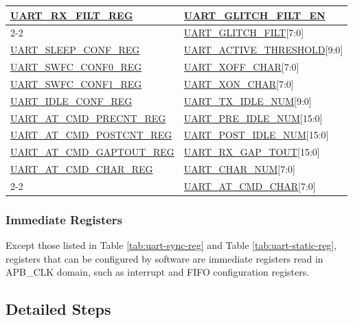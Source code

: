 \documentclass[main\_\_EN.tex]{subfiles}
\begin{document}
\begin{longtable}[c]{|p{6cm}|p{6cm}|}
\hyperref[regdesc:UARTRXFILTREG]{UART\_RX\_FILT\_REG} & \hyperref[fielddesc:UARTGLITCHFILTEN]{UART\_GLITCH\_FILT\_EN} \\\cline{2-2}
 & \hyperref[fielddesc:UARTGLITCHFILT]{UART\_GLITCH\_FILT}[7:0] \\\hline
\hyperref[regdesc:UARTSLEEPCONFREG]{UART\_SLEEP\_CONF\_REG} & \hyperref[fielddesc:UARTACTIVETHRESHOLD]{UART\_ACTIVE\_THRESHOLD}[9:0] \\\hline
\hyperref[regdesc:UARTSWFCCONF0REG]{UART\_SWFC\_CONF0\_REG} & \hyperref[fielddesc:UARTXOFFCHAR]{UART\_XOFF\_CHAR}[7:0] \\\hline
\hyperref[regdesc:UARTSWFCCONF1REG]{UART\_SWFC\_CONF1\_REG} & \hyperref[fielddesc:UARTXONCHAR]{UART\_XON\_CHAR}[7:0] \\\hline
\hyperref[regdesc:UARTIDLECONFREG]{UART\_IDLE\_CONF\_REG} & \hyperref[fielddesc:UARTTXIDLENUM]{UART\_TX\_IDLE\_NUM}[9:0] \\\hline
\hyperref[regdesc:UARTATCMDPRECNTREG]{UART\_AT\_CMD\_PRECNT\_REG} & \hyperref[fielddesc:UARTPREIDLENUM]{UART\_PRE\_IDLE\_NUM}[15:0] \\\hline
\hyperref[regdesc:UARTATCMDPOSTCNTREG]{UART\_AT\_CMD\_POSTCNT\_REG} & \hyperref[fielddesc:UARTPOSTIDLENUM]{UART\_POST\_IDLE\_NUM}[15:0] \\\hline
\hyperref[regdesc:UARTATCMDGAPTOUTREG]{UART\_AT\_CMD\_GAPTOUT\_REG} & \hyperref[fielddesc:UARTRXGAPTOUT]{UART\_RX\_GAP\_TOUT}[15:0] \\\hline
\hyperref[regdesc:UARTATCMDCHARREG]{UART\_AT\_CMD\_CHAR\_REG} & \hyperref[fielddesc:UARTCHARNUM]{UART\_CHAR\_NUM}[7:0] \\\cline{2-2}
 & \hyperref[fielddesc:UARTATCMDCHAR]{UART\_AT\_CMD\_CHAR}[7:0] \\\hline
\end{longtable}

\subsubsection{Immediate Registers}

Except those listed in Table \ref{tab:uart-sync-reg} and Table \ref{tab:uart-static-reg}, registers that can be configured by software are immediate registers read in APB\_CLK domain, such as interrupt and FIFO configuration registers.


\subsection{Detailed Steps}
\end{document}
